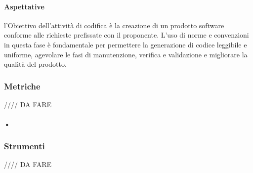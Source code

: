 \paragraph{Aspettative}

l'Obiettivo dell'attività di codifica è la creazione di un prodotto software conforme alle richieste prefissate con il proponente.  L'uso di norme e convenzioni in questa fase è fondamentale per permettere la generazione di codice leggibile e uniforme,  agevolare le fasi di manutenzione,  verifica e validazione e migliorare la qualità del prodotto.


\subsubsection{Metriche}

//// DA FARE

\paragraph{•}

\subsubsection{Strumenti}

//// DA FARE
